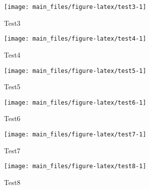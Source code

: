\begin{Schunk}
\begin{figure}[H]

{\centering \texttt{[image: main\_files/figure-latex/test3-1]} 

}

\caption[Test3 ]{Test3 }\label{fig:test3}
\end{figure}
\end{Schunk}

\begin{Schunk}
\begin{figure}[H]

{\centering \texttt{[image: main\_files/figure-latex/test4-1]} 

}

\caption[Test4 ]{Test4 }\label{fig:test4}
\end{figure}
\end{Schunk}

\begin{Schunk}
\begin{figure}[H]

{\centering \texttt{[image: main\_files/figure-latex/test5-1]} 

}

\caption[Test5 ]{Test5 }\label{fig:test5}
\end{figure}
\end{Schunk}

\begin{Schunk}
\begin{figure}[H]

{\centering \texttt{[image: main\_files/figure-latex/test6-1]} 

}

\caption[Test6 ]{Test6 }\label{fig:test6}
\end{figure}
\end{Schunk}

\begin{Schunk}
\begin{figure}[H]

{\centering \texttt{[image: main\_files/figure-latex/test7-1]} 

}

\caption[Test7 ]{Test7 }\label{fig:test7}
\end{figure}
\end{Schunk}

\begin{Schunk}
\begin{figure}[H]

{\centering \texttt{[image: main\_files/figure-latex/test8-1]} 

}

\caption[Test8 ]{Test8 }\label{fig:test8}
\end{figure}
\end{Schunk}

